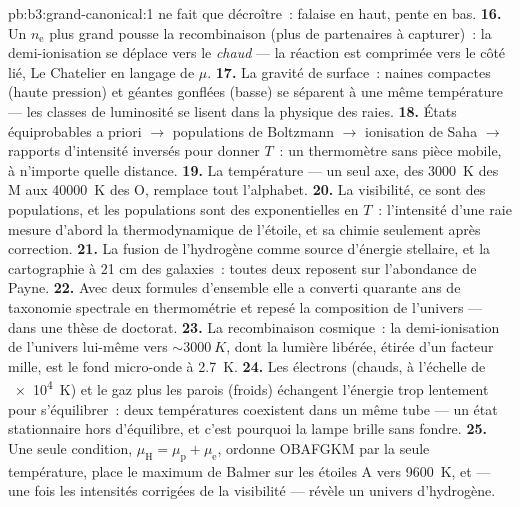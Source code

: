 \begin{solution}{pb:b3:grand-canonical:1}
ne fait que décroître~: falaise en haut, pente en bas.
\textbf{16.} Un $n_{\text{e}}$ plus grand pousse la recombinaison
(plus de partenaires à capturer)~: la demi-ionisation se déplace
vers le \emph{chaud} --- la réaction est comprimée vers le côté
lié, Le Chatelier en langage de $\mu$.
\textbf{17.} La gravité de surface~: naines compactes (haute
pression) et géantes gonflées (basse) se séparent à une même
température --- les classes de luminosité se lisent dans la
physique des raies.
\textbf{18.} États équiprobables a priori $\to$ populations de
Boltzmann $\to$ ionisation de Saha $\to$ rapports d'intensité
inversés pour donner $T$~: un thermomètre sans pièce mobile, à
n'importe quelle distance.
\textbf{19.} La température --- un seul axe, des \qty{3000}{K} des
M aux \qty{40000}{K} des O, remplace tout l'alphabet.
\textbf{20.} La visibilité, ce sont des populations, et les
populations sont des exponentielles en $T$~: l'intensité d'une raie
mesure d'abord la thermodynamique de l'étoile, et sa chimie
seulement après correction.
\textbf{21.} La fusion de l'hydrogène comme source d'énergie
stellaire, et la cartographie à 21 cm des galaxies~: toutes deux
reposent sur l'abondance de Payne.
\textbf{22.} Avec deux formules d'ensemble elle a converti quarante
ans de taxonomie spectrale en thermométrie et repesé la
composition de l'univers --- dans une thèse de doctorat.
\textbf{23.} La recombinaison cosmique~: la demi-ionisation de
l'univers lui-même vers $\sim\qty{3000}{K}$, dont la lumière
libérée, étirée d'un facteur mille, est le fond micro-onde à
\qty{2.7}{K}.
\textbf{24.} Les électrons (chauds, à l'échelle de \qty{e4}{K}) et
le gaz plus les parois (froids) échangent l'énergie trop lentement
pour s'équilibrer~: deux températures coexistent dans un même tube
--- un état stationnaire hors d'équilibre, et c'est pourquoi la
lampe brille sans fondre.
\textbf{25.} Une seule condition, $\mu_{\text{H}} = \mu_{\text{p}} +
\mu_{\text{e}}$, ordonne OBAFGKM par la seule température, place le
maximum de Balmer sur les étoiles A vers \qty{9600}{K}, et --- une
fois les intensités corrigées de la visibilité --- révèle un
univers d'hydrogène.
\end{solution}

